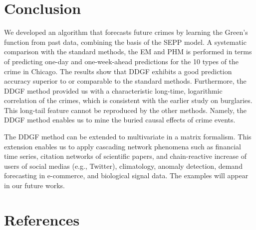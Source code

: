 \documentclass[review]{elsarticle}
\begin{document}
\section{Conclusion}\label{sec:5}
We developed an algorithm that forecasts future crimes by learning the Green's function from past data, combining the basis of the SEPP model. 
A systematic comparison with the standard methods, the EM and PHM is performed in terms of predicting one-day and one-week-ahead predictions for the 10 types of the crime in Chicago. The results show that DDGF exhibits a good prediction accuracy superior to or comparable to the standard methods. 
Furthermore,
the DDGF method provided us with 
a characteristic long-time, logarithmic correlation of the crimes, which is consistent with the earlier study on burglaries.
This long-tail feature cannot be reproduced by the other methods.
Namely, the DDGF method enables us to mine the buried causal effects of crime events.


The DDGF method can be extended to multivariate in a matrix formalism. 
This extension enables us to apply
cascading network phenomena such as 
financial time series, citation networks of scientific papers, and chain-reactive increase of users of social medias (e.g., Twitter),
climatology, anomaly detection,
demand forecasting in e-commerce, and biological signal data.
The examples will appear in our future works.



\section*{References}
\end{document}
